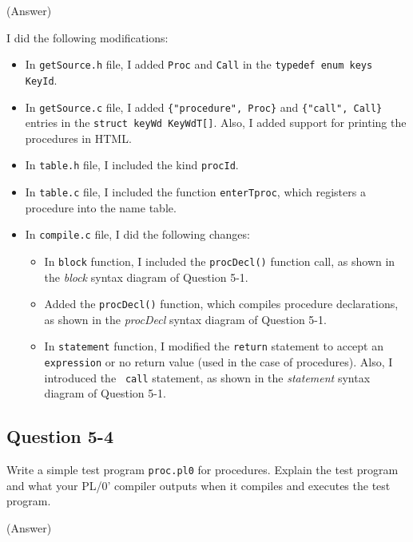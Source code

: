 \documentclass{article}
\begin{document}
\ifreport
(Answer)\\
\fi

I did the following modifications:

\begin{itemize}
    \item In {\tt getSource.h} file, I added {\tt Proc} and {\tt Call} in the
        {\tt typedef  enum  keys KeyId}.
    \item In {\tt getSource.c} file, I added {\tt \{"procedure", Proc\}} and
        {\tt \{"call", Call\}} entries in the {\tt struct keyWd KeyWdT[]}.
        Also, I added support for printing the procedures in HTML.
    \item In {\tt table.h} file, I included the kind {\tt procId}.
    \item In {\tt table.c} file, I included the function {\tt enterTproc},
        which registers a procedure into the name table.
    \item In {\tt compile.c} file, I did the following changes:
        \begin{itemize}
            \item In {\tt block} function, I included the {\tt procDecl()}
                function call, as shown in the \emph{block} syntax diagram of
                Question 5-1.
            \item Added the {\tt procDecl()} function, which compiles procedure
                declarations, as shown in the \emph{procDecl} syntax diagram
                of Question 5-1.
            \item In {\tt statement} function, I modified the {\tt return}
                statement to accept an {\tt expression} or no return value
                (used in the case of procedures). Also, I introduced the {\tt
                call} statement, as shown in the \emph{statement} syntax
                diagram of Question 5-1.
        \end{itemize}
\end{itemize}

\clearpage

\subsection*{Question 5-4}
Write a simple test program {\tt proc.pl0} for procedures.
Explain the test program and what your PL/0' compiler outputs when it
compiles and executes the test program.

\ifreport
(Answer)\\
\fi
\end{document}
